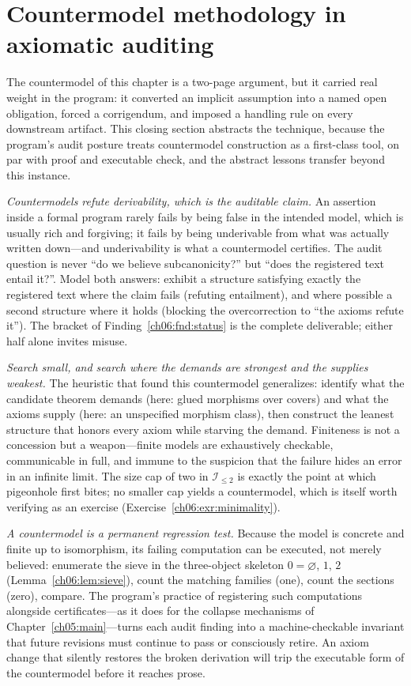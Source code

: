 \section{Countermodel methodology in axiomatic auditing}
\label{ch06:sec:methodology}

The countermodel of this chapter is a two-page argument, but it carried
real weight in the program: it converted an implicit assumption into a
named open obligation, forced a corrigendum, and imposed a handling rule on
every downstream artifact. This closing section abstracts the technique,
because the program's audit posture treats countermodel construction as a
first-class tool, on par with proof and executable check, and the abstract
lessons transfer beyond this instance.

\emph{Countermodels refute derivability, which is the auditable claim.}
An assertion inside a formal program rarely fails by being false in the
intended model, which is usually rich and forgiving; it fails by being
underivable from what was actually written down---and underivability is
what a countermodel certifies. The audit question is never ``do we believe
subcanonicity?'' but ``does the registered text entail it?''. Model both
answers: exhibit a structure satisfying exactly the registered text where
the claim fails (refuting entailment), and where possible a second
structure where it holds (blocking the overcorrection to
``the axioms refute it''). The bracket of Finding~\ref{ch06:fnd:status} is
the complete deliverable; either half alone invites misuse.

\emph{Search small, and search where the demands are strongest and the
supplies weakest.} The heuristic that found this countermodel generalizes:
identify what the candidate theorem demands (here: glued morphisms over
covers) and what the axioms supply (here: an unspecified morphism class),
then construct the leanest structure that honors every axiom while
starving the demand. Finiteness is not a concession but a weapon---finite
models are exhaustively checkable, communicable in full, and immune to the
suspicion that the failure hides an error in an infinite limit. The size
cap of two in $\mathcal{I}_{\le 2}$ is exactly the point at which
pigeonhole first bites; no smaller cap yields a countermodel, which is
itself worth verifying as an exercise (Exercise~\ref{ch06:exr:minimality}).

\emph{A countermodel is a permanent regression test.} Because the model is
concrete and finite up to isomorphism, its failing computation can be
executed, not merely believed: enumerate the sieve in the three-object
skeleton $0=\varnothing$, $1$, $2$ (Lemma~\ref{ch06:lem:sieve}), count the
matching families (one), count the sections (zero), compare. The program's
practice of registering such computations alongside certificates---as it
does for the collapse mechanisms of Chapter~\ref{ch05:main}---turns each
audit finding into a machine-checkable invariant that future revisions must
continue to pass or consciously retire. An axiom change that silently
restores the broken derivation will trip the executable form of the
countermodel before it reaches prose.

